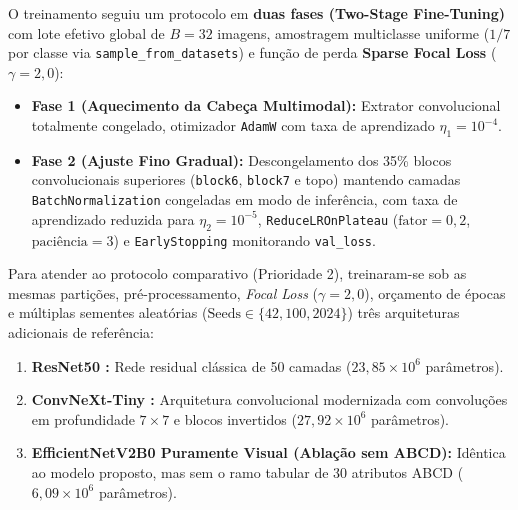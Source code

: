 \documentclass[12pt,a4paper]{article}
\begin{document}
O treinamento seguiu um protocolo em \textbf{duas fases (Two-Stage Fine-Tuning)} com lote efetivo global de $B = 32$ imagens, amostragem multiclasse uniforme ($1/7$ por classe via \texttt{sample\_from\_datasets}) e função de perda \textbf{Sparse Focal Loss} \cite{lin2017} ($\gamma = 2{,}0$):
\begin{itemize}
    \item \textbf{Fase 1 (Aquecimento da Cabeça Multimodal):} Extrator convolucional totalmente congelado, otimizador \texttt{AdamW} \cite{loshchilov2019} com taxa de aprendizado $\eta_1 = 10^{-4}$.
    \item \textbf{Fase 2 (Ajuste Fino Gradual):} Descongelamento dos 35\% blocos convolucionais superiores (\texttt{block6}, \texttt{block7} e topo) mantendo camadas \texttt{BatchNormalization} congeladas em modo de inferência, com taxa de aprendizado reduzida para $\eta_2 = 10^{-5}$, \texttt{ReduceLROnPlateau} ($\text{fator}=0{,}2$, $\text{paciência}=3$) e \texttt{EarlyStopping} monitorando \texttt{val\_loss}.
\end{itemize}

Para atender ao protocolo comparativo (Prioridade 2), treinaram-se sob as mesmas partições, pré-processamento, \textit{Focal Loss} ($\gamma=2{,}0$), orçamento de épocas e múltiplas sementes aleatórias ($\text{Seeds} \in \{42, 100, 2024\}$) três arquiteturas adicionais de referência:
\begin{enumerate}
    \item \textbf{ResNet50 \cite{he2016}:} Rede residual clássica de 50 camadas ($23{,}85 \times 10^6$ parâmetros).
    \item \textbf{ConvNeXt-Tiny \cite{liu2022}:} Arquitetura convolucional modernizada com convoluções em profundidade $7 \times 7$ e blocos invertidos ($27{,}92 \times 10^6$ parâmetros).
    \item \textbf{EfficientNetV2B0 Puramente Visual (Ablação sem ABCD):} Idêntica ao modelo proposto, mas sem o ramo tabular de 30 atributos ABCD ($6{,}09 \times 10^6$ parâmetros).
\end{enumerate}
\end{document}
